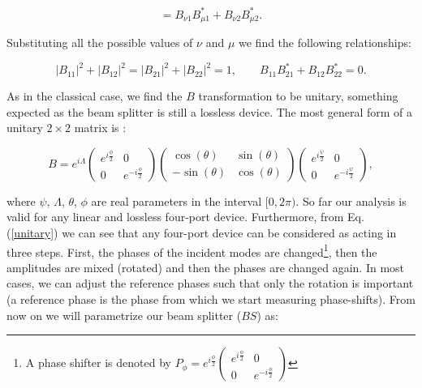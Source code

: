 \documentclass[12pt]{book}
\begin{document}
\begin{equation}
   [\mathbf{a}'_{\nu},\mathbf{a}'^{\dagger}_{\mu}]=B_{\nu 1} B_{\mu 1}^{*}+B_{\nu 2} B_{\mu 2}^{*} .
\end{equation}

Substituting all the possible values of $\nu$ and $\mu$ we find the following relationships:

\begin{equation}
|B_{11}|^{2}+|B_{12}|^{2}=|B_{21}|^{2}+|B_{22}|^{2}=1 ,\qquad B_{11} B_{21}^{*}+B_{12} B_{22}^{*}=0.
\end{equation}

As in the classical case, we find the $B$ transformation to be unitary, something expected as the beam splitter is still a lossless device. The most general form of a unitary $2\times2$ matrix is \cite{leonhardt}:


\begin{equation}
B=e^{i\Lambda} \begin{pmatrix} e^{i\frac{\phi}{2}} & 0 \\ 0 & e^{-i\frac{\phi}{2}} \end{pmatrix} \begin{pmatrix} \cos(\theta) &  \sin(\theta) \\ - \sin(\theta) & \cos(\theta) \end{pmatrix} \begin{pmatrix} e^{i\frac{\psi}{2}} & 0 \\ 0 & e^{-i\frac{\psi}{2}} \end{pmatrix} \label{unitary},
\end{equation}

where $\psi$, $\Lambda$, $\theta$, $\phi$ are real parameters in the interval $[0,2\pi)$. So far our analysis is valid for any linear and lossless four-port device. Furthermore, from Eq. (\ref{unitary}) we can see that any four-port device can be considered as acting in three steps. First, the phases of the incident modes are changed\footnote{A phase shifter is denoted by $P_{\phi}=e^{i \frac{\phi}{2}}\begin{pmatrix}e^{i \frac{\phi}{2}} & 0 \\0 & e^{-i \frac{\phi}{2}} \end{pmatrix}$}, then the amplitudes are mixed (rotated) and then the phases are changed again. In most cases, we can adjust the reference phases such that only the rotation is important (a reference phase is the phase from which we start measuring phase-shifts). From now on we will parametrize our beam splitter ($BS$) as:
\end{document}
